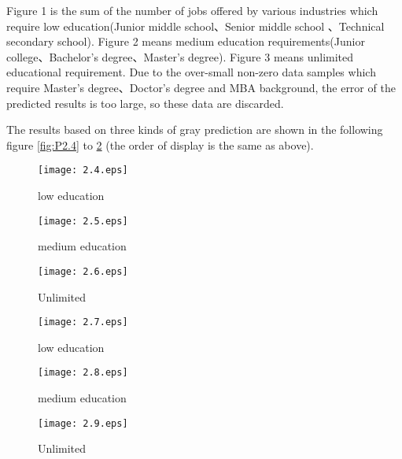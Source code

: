 \documentclass{mcmthesis}
\begin{document}


\par\noindent
Figure 1 is the sum of the number of jobs offered by various industries which require low education(Junior middle school、Senior middle school 、Technical secondary school). Figure 2 means medium education requirements(Junior college、Bachelor's degree、Master's degree). Figure 3 means unlimited educational requirement. Due to the over-small non-zero data samples which require Master’s degree、Doctor’s degree and MBA background, the error of the predicted results is too large, so these data are discarded.

\par\noindent
The results based on three kinds of gray prediction are shown in the following figure \ref{fig:P2.4} to \ref{fig:P2.9} (the order of display is the same as above).

\begin{figure}[h]
	\begin{minipage}[h]{0.31\linewidth}
		\centering
		\texttt{[image: 2.4.eps]}
		\caption{low education}
		\label{fig:P2.4}
	\end{minipage}
	\begin{minipage}[h]{0.31\linewidth}
		\centering
		\texttt{[image: 2.5.eps]}
		\caption{medium education}
		\label{fig:P2.5}
	\end{minipage}
	\begin{minipage}[h]{0.31\linewidth}
		\centering
		\texttt{[image: 2.6.eps]}
		\caption{Unlimited}
		\label{fig:P2.6}
	\end{minipage}
\end{figure}

\begin{figure}[h]
	\begin{minipage}[h]{0.31\linewidth}
		\centering
		\texttt{[image: 2.7.eps]}
		\caption{low education}
		\label{fig:P2.7}
	\end{minipage}
	\begin{minipage}[h]{0.31\linewidth}
		\centering
		\texttt{[image: 2.8.eps]}
		\caption{medium education}
		\label{fig:P2.8}
	\end{minipage}
	\begin{minipage}[h]{0.31\linewidth}
		\centering
		\texttt{[image: 2.9.eps]}
		\caption{Unlimited}
		\label{fig:P2.9}
	\end{minipage}
\end{figure}
\end{document}
